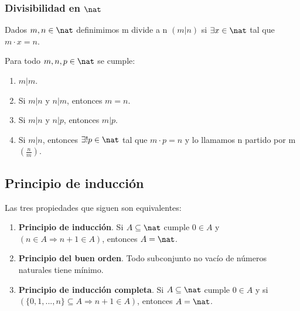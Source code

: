 \subsubsection{Divisibilidad en $\nat$}
\begin{ndef}[Divisibilidad]
    Dados $m,n \in \nat$ definimimos m divide a n $(m|n)$ si $\exists x \in \nat$ tal que $m \cdot x = n$.
\end{ndef}

\begin{properties}
    Para todo $m,n,p \in \nat$ se cumple:
    \begin{enumerate}
        \item $m|m$.
        \item Si $m|n$ y $n|m$, entonces $m = n$.
        \item Si $m|n$ y $n|p$, entonces $m|p$.
        \item Si $m|n$, entonces $\exists! p \in \nat$ tal que $m \cdot p = n$ y lo llamamos n partido por m $\left( \frac{n}{m} \right)$.
    \end{enumerate}
\end{properties}

\subsection{Principio de inducción}
\begin{nth}
    Las tres propiedades que siguen son equivalentes:
    \begin{enumerate}
        \item \textbf{Principio de inducción}. Si $A \subseteq \nat$ cumple $0 \in A$ y $(n \in A \Rightarrow n + 1 \in A)$, entonces $A = \nat$.
        \item \textbf{Principio del buen orden}. Todo subconjunto no vacío de números naturales tiene mínimo.
        \item \textbf{Principio de inducción completa}. Si $A \subseteq \nat$ cumple $0 \in A$ y si $(\{0,1,...,n\} \subseteq A \Rightarrow n + 1 \in A)$, entonces $A = \nat$.
    \end{enumerate}
\end{nth}

